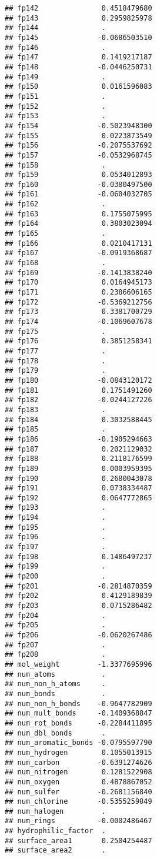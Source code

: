 \documentclass[]{article}
\begin{document}
\begin{verbatim}
## fp142               0.4518479680
## fp143               0.2959825978
## fp144               .           
## fp145              -0.0686503510
## fp146               .           
## fp147               0.1419217187
## fp148              -0.0446250731
## fp149               .           
## fp150               0.0161596083
## fp151               .           
## fp152               .           
## fp153               .           
## fp154              -0.5023948300
## fp155               0.0223873549
## fp156              -0.2075537692
## fp157              -0.0532968745
## fp158               .           
## fp159               0.0534012893
## fp160              -0.0380497500
## fp161              -0.0604032705
## fp162               .           
## fp163               0.1755075995
## fp164               0.3803023094
## fp165               .           
## fp166               0.0210417131
## fp167              -0.0919368687
## fp168               .           
## fp169              -0.1413838240
## fp170               0.0164945173
## fp171               0.2386606165
## fp172              -0.5369212756
## fp173               0.3381700729
## fp174              -0.1069607678
## fp175               .           
## fp176               0.3851258341
## fp177               .           
## fp178               .           
## fp179               .           
## fp180              -0.0843120172
## fp181               0.1751491260
## fp182              -0.0244127226
## fp183               .           
## fp184               0.3032588445
## fp185               .           
## fp186              -0.1905294663
## fp187               0.2021129032
## fp188               0.2118176599
## fp189               0.0003959395
## fp190               0.2680043078
## fp191               0.0738334487
## fp192               0.0647772865
## fp193               .           
## fp194               .           
## fp195               .           
## fp196               .           
## fp197               .           
## fp198               0.1486497237
## fp199               .           
## fp200               .           
## fp201              -0.2814870359
## fp202               0.4129189839
## fp203               0.0715286482
## fp204               .           
## fp205               .           
## fp206              -0.0620267486
## fp207               .           
## fp208               .           
## mol_weight         -1.3377695996
## num_atoms           .           
## num_non_h_atoms     .           
## num_bonds           .           
## num_non_h_bonds    -0.9647782909
## num_mult_bonds     -0.1409368847
## num_rot_bonds      -0.2284411895
## num_dbl_bonds       .           
## num_aromatic_bonds -0.0795597790
## num_hydrogen        0.1055013915
## num_carbon         -0.6391274626
## num_nitrogen        0.1281522908
## num_oxygen          0.4878867052
## num_sulfer         -0.2681156840
## num_chlorine       -0.5355259849
## num_halogen         .           
## num_rings          -0.0002486467
## hydrophilic_factor  .           
## surface_area1       0.2504254487
## surface_area2       .
\end{verbatim}
\end{document}
